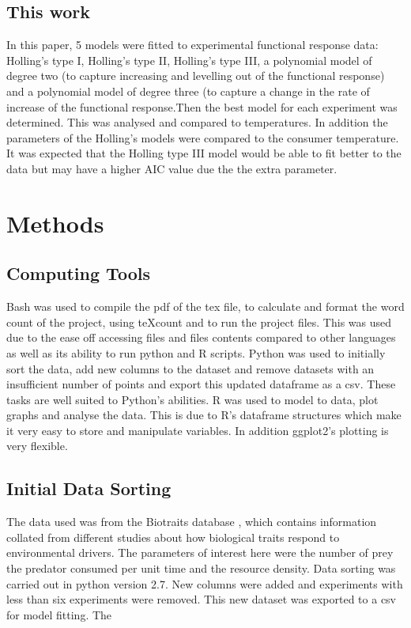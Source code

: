 \documentclass{article}
\begin{document}
\subsection{This work}
In this paper, 5 models were fitted to experimental functional response data: Holling's type I, Holling's type II, Holling's type III, a polynomial model of degree two (to capture increasing and levelling out of the functional response) and a polynomial model of degree three (to capture a change in the rate of increase of the functional response.Then the best model for each experiment was determined. This was analysed and compared to temperatures. In addition the parameters of the Holling's models were compared to the consumer temperature.\\
It was expected that the Holling type III model would be able to fit better to the data but may have a higher AIC value due the the extra parameter. 
%
\section{Methods}
\subsection{Computing Tools}
Bash was used to compile the pdf of the tex file, to calculate and format the word count of the project, using teXcount and to run the project files. This was used due to the ease off accessing files and files contents compared to other languages as well as its ability to run python and R scripts.
Python was used to initially sort the data, add new columns to the dataset and remove datasets with an insufficient number of points and export this updated dataframe as a csv. These tasks are well suited to Python's abilities.
R was used to model to data, plot graphs and analyse the data. This is due to R's dataframe structures which make it very easy to store and manipulate variables. In addition ggplot2's plotting is very flexible.
\subsection{Initial Data Sorting}
The data used was from the Biotraits database \cite{Dell2013}, which contains information collated from different studies about how biological traits respond to environmental drivers. The parameters of interest here were the number of prey the predator consumed per unit time and the resource density. Data sorting was carried out in python version 2.7. New columns were added and experiments with less than six experiments were removed. This new dataset was exported to a csv for model fitting. The
\end{document}
